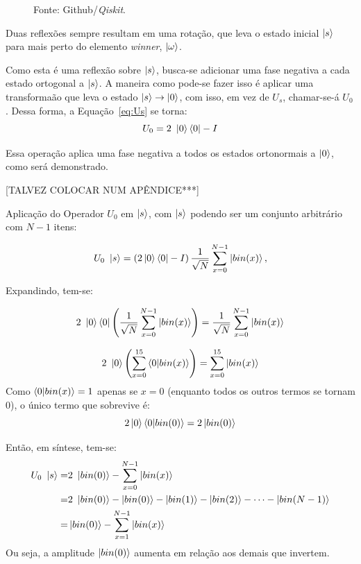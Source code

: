 \begin{figure}[ht!]
    \vspace{0.5em}
    {\small Fonte: Github/\emph{Qiskit}.}
\end{figure}

Duas reflexões sempre resultam em uma rotação, que leva o estado inicial $\ket{s}$ para mais perto do elemento \textit{winner}, $\ket{\omega}$. 

Como esta é uma reflexão sobre $\ket{s}$, busca-se adicionar uma fase negativa a cada estado ortogonal a $\ket{s}$. A maneira como pode-se fazer isso é aplicar uma transforma\~{a}o que leva o estado $\ket{s} \to \ket{0}$, com isso, em vez de $U_s$, chamar-se-á $U_0$. Dessa forma, a Equaç\~{a}o~\ref{eq:Us} se torna: 
%
\begin{equation}
    U_0 = 2~\ket{0}\bra{0} - I
    \label{eq:Uo}
\end{equation}

Essa operação aplica uma fase negativa a todos os estados ortonormais a $\ket{0}$, como será demonstrado.

[TALVEZ COLOCAR NUM APÊNDICE***]

Aplicação do Operador $U_0$ em $\ket{s}$, com $\ket{s}$ podendo ser um conjunto arbitr\'{a}rio com $N-1$ itens:

\begin{equation*}
U_0~\ket{s} = \left(2\ket{0}\bra{0} - I\right) \frac{1}{\sqrt{N}}\sum_{x=0}^{N-1} \ket{bin(x)},
\end{equation*}

Expandindo, tem-se:

\begin{equation*}
2~\ket{0}\bra{0} \left( \frac{1}{\sqrt{N}}\sum_{x=0}^{N-1} \ket{bin(x)}\right) = \frac{1}{\sqrt{N}}\sum_{x=0}^{N-1} \ket{bin(x)}
\end{equation*}

\begin{equation}
2~\ket{0} \left( \sum_{x=0}^{15} \braket{0|bin(x)}\right) = \sum_{x=0}^{15} \ket{bin(x)}
\label{eq:aplicacaoDifusor 2}
\end{equation}
%
Como $\braket{0|bin(x)} = 1$ apenas se $x = 0$ (enquanto todos os outros termos se tornam $0$),  o único termo que sobrevive é:
%
\begin{equation*}
2\ket{0}{\braket{0|bin(0)}} = 2\ket{bin(0)}
\end{equation*}

Então, em síntese, tem-se:
%
\begin{align}
\notag
U_0~\ket{s} = &2~\ket{bin(0)} - \sum_{x=0}^{N-1} \ket{bin(x)} \\ 
\notag
= &2~\ket{bin(0)} - \ket{bin(0)} - \ket{bin(1)} - \ket{bin(2)} - \dots - \ket{bin(N-1)} \\ 
= &\ket{bin(0)} - \sum_{x=1}^{N-1} \ket{bin(x)}
\label{eq:aplicacaoDifusao}
\end{align}
%
Ou seja, a amplitude $\ket{bin(0)}$ aumenta em relação aos demais que invertem.

